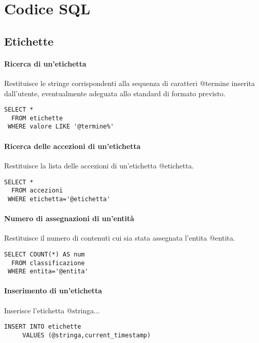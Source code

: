 \section*{Codice SQL}

\subsection*{Etichette}

\paragraph{Ricerca di un'etichetta}
Restituisce le stringe corrispondenti alla sequenza di caratteri \textsf{@termine} inserita dall'utente, eventualmente adeguata allo standard di formato previsto.

\begin{verbatim}
SELECT *
  FROM etichette	
 WHERE valore LIKE '@termine%'
\end{verbatim}
	
\paragraph{Ricerca delle accezioni di un'etichetta}
Restituisce la lista delle accezioni di un'etichetta \textsf{@etichetta}.
	
\begin{verbatim}
SELECT *
  FROM accezioni	
 WHERE etichetta='@etichetta'
\end{verbatim}

\paragraph{Numero di assegnazioni di un'entità}
Restituisce il numero di contenuti cui sia stata assegnata l'entita \textsf{@entita}.

\begin{verbatim}
SELECT COUNT(*) AS num
  FROM classificazione
 WHERE entita='@entita'
\end{verbatim}

\paragraph{Inserimento di un'etichetta}
Inserisce l'etichetta \textsf{@stringa}...
	
\begin{verbatim}
INSERT INTO etichette
     VALUES (@stringa,current_timestamp)
\end{verbatim}

